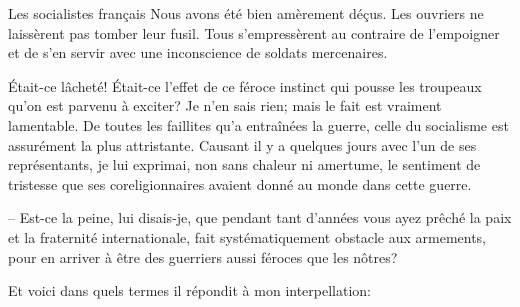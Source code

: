 \begin{chapter}{Les socialistes français}
Nous avons été bien amèrement déçus. Les ouvriers ne laissèrent pas
tomber leur fusil. Tous s'empressèrent au contraire de l'empoigner et de
s'en servir avec une inconscience de soldats mercenaires.

Était-ce lâcheté! Était-ce l'effet de ce féroce instinct qui pousse les
troupeaux qu'on est parvenu à exciter? Je n'en sais rien; mais le fait
est vraiment lamentable. De toutes les faillites qu'a entraînées la
guerre, celle du socialisme est assurément la plus attristante. Causant
il y a quelques jours avec l'un de ses représentants, je lui exprimai,
non sans chaleur ni amertume, le sentiment de tristesse que ses
coreligionnaires avaient donné au monde dans cette guerre.

-- Est-ce la peine, lui disais-je, que pendant tant d'années vous ayez
prêché la paix et la fraternité internationale, fait systématiquement
obstacle aux armements, pour en arriver à être des guerriers aussi
féroces que les nôtres?

Et voici dans quels termes il répondit à mon interpellation:


\end{chapter}
